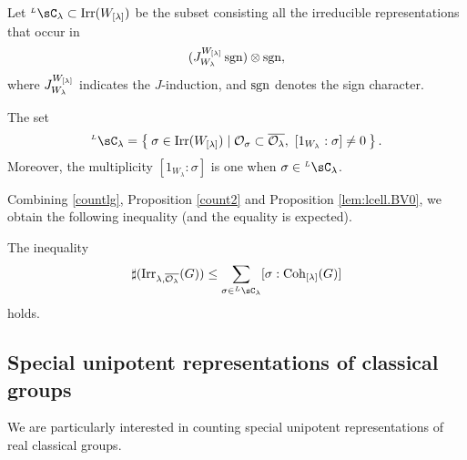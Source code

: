\documentclass[counting_main.tex]{subfiles}
\begin{document}
Let $\LC_{\lambda}\subset \Irr(W_\Lam)$ be the subset consisting all the irreducible representations that occur in
  \[
    (J_{W_{\lambda}}^{W_{{[\lambda]}}} \operatorname{sgn} )\otimes \operatorname{sgn},
  \]
where $J_{W_{\lambda}}^{W_{{[\lambda]}}} $ indicates the $J$-induction, and $\operatorname{sgn}$ denotes the sign character.



 \begin{prop}\label{lem:lcell.BV0}
 The set
 \[
    \LC_{\lambda} = \Set{\sigma\in  \Irr(W_\Lam)\mid \CO_\sigma\subset \overline{\CO_\lambda}, \    [1_{W_{\lambda}}:\sigma]\neq 0}.
   \]
  Moreover, the multiplicity $[1_{W_{\lambda}}:\sigma]$ is one
  when $\sigma\in \LC_\lambda$.
\end{prop}

Combining \eqref{countlg}, Proposition \ref{count2}
and Proposition \ref{lem:lcell.BV0}, we obtain the following inequality (and the equality is expected).

\begin{cor}
 The inequality
  \begin{equation}\label{boundc}
    \sharp(\Irr_{\lambda,\overline{\CO_\lambda}}(G)) \leq \sum_{\sigma\in \LC_\lambda} [\sigma: \Coh_{\Lam}(G)]
  \end{equation}
  holds.
\end{cor}



\subsection{Special unipotent representations of classical groups}

We are particularly interested in counting special unipotent representations of
real classical groups.
\end{document}
